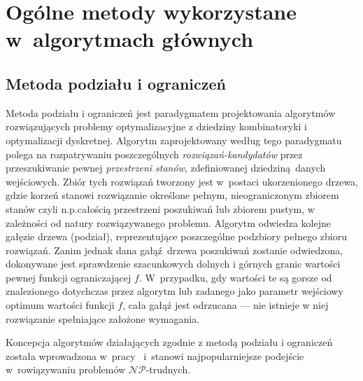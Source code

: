 \section{Ogólne metody wykorzystane w~algorytmach głównych}\label{s_methods}

\subsection{Metoda podziału i ograniczeń}\label{ss_branch_and_bound}
\par{
  Metoda podziału i ograniczeń jest paradygmatem projektowania algorytmów rozwiązujących problemy optymalizacyjne z dziedziny kombinatoryki i optymalizacji dyskretnej.
  Algorytm zaprojektowany według tego paradygmatu polega na rozpatrywaniu poszczególnych \emph{rozwiązań-kandydatów} przez przeszukiwanie pewnej \emph{przestrzeni stanów}, zdefiniowanej dziedziną danych wejściowych.
  Zbiór tych rozwiązań tworzony jest w~postaci ukorzenionego drzewa, gdzie korzeń stanowi rozwiązanie określone pełnym, nieograniczonym zbiorem stanów czyli n.p.całością przestrzeni poszukiwań lub zbiorem pustym, w zależności od natury rozwiązywanego problemu.
  Algorytm odwiedza kolejne gałęzie drzewa (podział), reprezentujące poszczególne
  podzbiory pełnego zbioru rozwiązań.
  Zanim jednak dana gałąź~drzewa poszukiwań zostanie odwiedzona, dokonywane jest sprawdzenie szacunkowych dolnych i górnych granic wartości pewnej funkcji ograniczającej $f$.
  W~przypadku, gdy wartości te są gorsze od znalezionego dotychczas przez algorytm lub zadanego jako parametr wejściowy optimum wartości funkcji $f$, cała gałąź jest odrzucana --- nie istnieje w niej rozwiązanie spełniające założone wymagania.
}
\par{
  Koncepcja algorytmów działających zgodnie z metodą podziału i ograniczeń została wprowadzona w~pracy~\cite{land60} i~stanowi najpopularniejsze podejście w~rowiązywaniu problemów $\mathcal{NP}$-trudnych.
}
